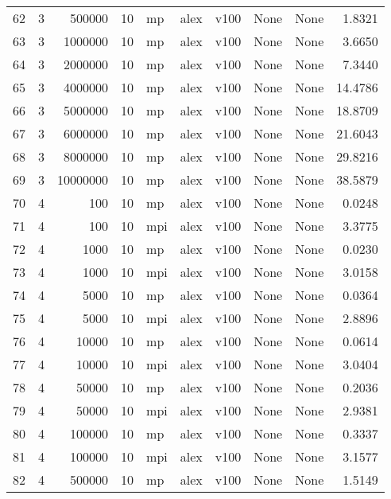 \begin{tabular}{lrrrlllllr}
62  &   3 &    500000 &      10 &   mp &  alex &  v100 &  None &  None &   1.8321 \\
63  &   3 &   1000000 &      10 &   mp &  alex &  v100 &  None &  None &   3.6650 \\
64  &   3 &   2000000 &      10 &   mp &  alex &  v100 &  None &  None &   7.3440 \\
65  &   3 &   4000000 &      10 &   mp &  alex &  v100 &  None &  None &  14.4786 \\
66  &   3 &   5000000 &      10 &   mp &  alex &  v100 &  None &  None &  18.8709 \\
67  &   3 &   6000000 &      10 &   mp &  alex &  v100 &  None &  None &  21.6043 \\
68  &   3 &   8000000 &      10 &   mp &  alex &  v100 &  None &  None &  29.8216 \\
69  &   3 &  10000000 &      10 &   mp &  alex &  v100 &  None &  None &  38.5879 \\
70  &   4 &       100 &      10 &   mp &  alex &  v100 &  None &  None &   0.0248 \\
71  &   4 &       100 &      10 &  mpi &  alex &  v100 &  None &  None &   3.3775 \\
72  &   4 &      1000 &      10 &   mp &  alex &  v100 &  None &  None &   0.0230 \\
73  &   4 &      1000 &      10 &  mpi &  alex &  v100 &  None &  None &   3.0158 \\
74  &   4 &      5000 &      10 &   mp &  alex &  v100 &  None &  None &   0.0364 \\
75  &   4 &      5000 &      10 &  mpi &  alex &  v100 &  None &  None &   2.8896 \\
76  &   4 &     10000 &      10 &   mp &  alex &  v100 &  None &  None &   0.0614 \\
77  &   4 &     10000 &      10 &  mpi &  alex &  v100 &  None &  None &   3.0404 \\
78  &   4 &     50000 &      10 &   mp &  alex &  v100 &  None &  None &   0.2036 \\
79  &   4 &     50000 &      10 &  mpi &  alex &  v100 &  None &  None &   2.9381 \\
80  &   4 &    100000 &      10 &   mp &  alex &  v100 &  None &  None &   0.3337 \\
81  &   4 &    100000 &      10 &  mpi &  alex &  v100 &  None &  None &   3.1577 \\
82  &   4 &    500000 &      10 &   mp &  alex &  v100 &  None &  None &   1.5149 \\

\end{tabular}
